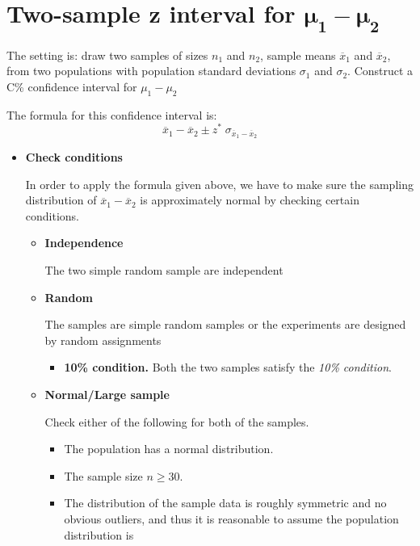 \documentclass[a4paper, 12pt,twoside]{book}
\begin{document}
 \section{Two-sample z interval for $\mathbf{\mu_1 - \mu_2}$}
 
 The setting is: draw two samples of sizes $n_1$ and $n_2$, sample means $\overline{x}_1$ and $\overline{x}_2$, from two populations with population standard deviations $\sigma_1$ and $\sigma_2$. Construct a C\% confidence interval for $\mu_1-\mu_2$\vspace{0.3cm}
 
 The formula for this confidence interval is:
 $$\overline{x}_1 - \overline{x}_2 \pm z^*\; \sigma_{\overline{x}_1 - \overline{x}_2}$$
 
 \begin{itemize}
     \item \textbf{Check conditions}\vspace{0.3cm}
     
     In order to apply the formula given above, we have to make sure the sampling distribution of $\overline{x}_1 - \overline{x}_2 $ is approximately normal by checking certain conditions.
     \begin{itemize}
        \item \textbf{Independence}\vspace{0.3cm}
        
        The two simple random sample are independent
        
        \item \textbf{Random}\vspace{0.3cm}
        
        The samples are simple random samples or the experiments are designed by random assignments
        
        \begin{itemize}
           \item \textbf{10\% condition.} Both the two samples satisfy the \textit{10\% condition}.
        \end{itemize}
        
        \item \textbf{Normal/Large sample}\vspace{0.3cm}
        
        Check either of the following for both of the samples.
        \begin{itemize}
                     \item The population has a normal distribution.
         \item The sample size $n \geq 30$.
           \item The distribution of the sample data is  roughly symmetric and no obvious outliers, and thus it is reasonable to assume the population distribution is
        \end{itemize}
        

\end{itemize}
\end{itemize}
\end{document}
